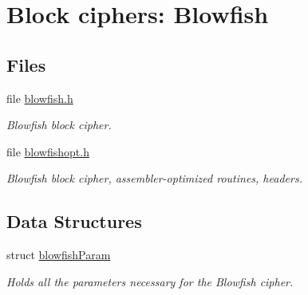 \hypertarget{group__BC__blowfish__m}{
\section{Block ciphers: Blowfish}
\label{group__BC__blowfish__m}
}
\subsection*{Files}
\begin{CompactItemize}
\item 
file \hyperlink{blowfish_8h}{blowfish.h}
\begin{CompactList}\small\item\em Blowfish block cipher. \item\end{CompactList}

\item 
file \hyperlink{blowfishopt_8h}{blowfishopt.h}
\begin{CompactList}\small\item\em Blowfish block cipher, assembler-optimized routines, headers. \item\end{CompactList}

\end{CompactItemize}
\subsection*{Data Structures}
\begin{CompactItemize}
\item 
struct \hyperlink{structblowfishParam}{blowfish\-Param}
\begin{CompactList}\small\item\em Holds all the parameters necessary for the Blowfish cipher. \item\end{CompactList}\end{CompactItemize}
